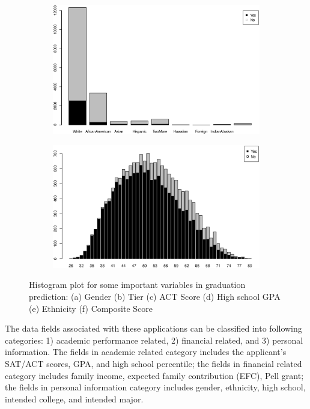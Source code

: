 \documentclass[12pt,english]{report}
\begin{document}
\begin{figure}[p]
\medskip
\begin{subfigure}{0.48\textwidth}
\includegraphics[width=\linewidth]{pic/grad_ethnicity}
\caption{} \label{grad:e}
\end{subfigure}\hspace*{\fill}
\begin{subfigure}{0.48\textwidth}
\includegraphics[width=\linewidth]{pic/grad_comp}
\caption{} \label{grad:f}
\end{subfigure}
  \caption{Histogram plot for some important variables in graduation prediction: 
                        (a) Gender (b) Tier (c) ACT Score (d) High school GPA (e) Ethnicity (f) Composite Score} 
  \label{grad_sum} 
\end{figure}



The data fields associated with these applications can be classified into
following categories: 1) academic performance related, 2) financial related,
and 3) personal information. The fields in academic related category includes
the applicant's SAT/ACT scores, GPA, and high school percentile; the  fields in
financial  related category includes family income, expected family
contribution (EFC), Pell grant; the fields in personal information category
includes gender, ethnicity, high school, intended college, and intended major.
\end{document}
